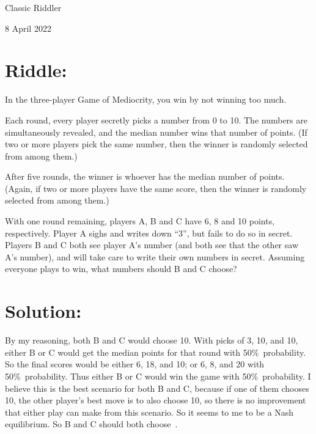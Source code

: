 \documentclass{article}
\begin{document}
\pagestyle{empty} %

\begin{center}
{\LARGE Classic Riddler}

\vspace{0.15in}

{\Large 8 April 2022}
\end{center}


\section*{Riddle:}

In the three-player Game of Mediocrity, you win by not winning too much.

Each round, every player secretly picks a number from 0 to 10. The numbers are simultaneously revealed, and the median number wins that number of points.
(If two or more players pick the same number, then the winner is randomly selected from among them.)

After five rounds, the winner is whoever has the median number of points.
(Again, if two or more players have the same score, then the winner is randomly selected from among them.)

With one round remaining, players A, B and C have 6, 8 and 10 points, respectively.
Player A sighs and writes down ``3'', but fails to do so in secret.
Players B and C both see player A's number (and both see that the other saw A's number), and will take care to write their own numbers in secret.
Assuming everyone plays to win, what numbers should B and C choose?


\section*{Solution:}

By my reasoning, both B and C would choose 10.
With picks of 3, 10, and 10, either B or C would get the median points for that round with 50\%\ probability.
So the final scores would be either 6, 18, and 10; or 6, 8, and 20 with 50\%\ probability.
Thus either B or C would win the game with 50\%\ probability.
I believe this is the best scenario for both B and C, because if one of them chooses 10, the other player's best move is to also choose 10, so there is no improvement that either play can make from this scenario.
So it seems to me to be a Nash equilibrium.
So B and C should both choose \,.
\end{document}
